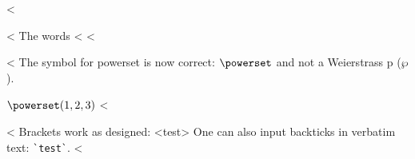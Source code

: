<%

<%
The words <%
<%

<%
The symbol for powerset is now correct: $\powerset$ and not a Weierstrass p ($\wp$).

$\powerset({1,2,3})$
<%

<%
Brackets work as designed:
<test>
One can also input backticks in verbatim text: \verb|`test`|.
<%
